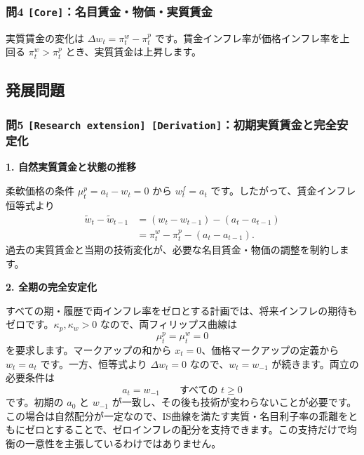 \documentclass[
  japanese,
  lualatex,
  ja=standard,
  11pt,
  a4paper]{ltjsarticle}
\begin{document}
\subsubsection{\texorpdfstring{問4
\texttt{{[}Core{]}}：名目賃金・物価・実質賃金}{問4 {[}Core{]}：名目賃金・物価・実質賃金}}\label{ux554f4-coreux540dux76eeux8cc3ux91d1ux7269ux4fa1ux5b9fux8ceaux8cc3ux91d1}

実質賃金の変化は \(\Delta w_t=\pi_t^w-\pi_t^p\)
です。賃金インフレ率が価格インフレ率を上回る \(\pi_t^w>\pi_t^p\)
とき、実質賃金は上昇します。

\subsection{発展問題}\label{ux767aux5c55ux554fux984c-9}

\subsubsection{\texorpdfstring{問5
\texttt{{[}Research\ extension{]}\ {[}Derivation{]}}：初期実質賃金と完全安定化}{問5 {[}Research extension{]} {[}Derivation{]}：初期実質賃金と完全安定化}}\label{ux554f5-research-extension-derivationux521dux671fux5b9fux8ceaux8cc3ux91d1ux3068ux5b8cux5168ux5b89ux5b9aux5316}

\textbf{1. 自然実質賃金と状態の推移}

柔軟価格の条件 \(\mu_t^p=a_t-w_t=0\) から \(w_t^f=a_t\)
です。したがって、賃金インフレ恒等式より \[
\begin{aligned}
\widetilde w_t-\widetilde w_{t-1}
&=(w_t-w_{t-1})-(a_t-a_{t-1})\\
&=\pi_t^w-\pi_t^p-(a_t-a_{t-1}).
\end{aligned}
\]
過去の実質賃金と当期の技術変化が、必要な名目賃金・物価の調整を制約します。

\textbf{2. 全期の完全安定化}

すべての期・履歴で両インフレ率をゼロとする計画では、将来インフレの期待もゼロです。\(\kappa_p,\kappa_w>0\)
なので、両フィリップス曲線は \[
\mu_t^p=\mu_t^w=0
\] を要求します。マークアップの和から
\(x_t=0\)、価格マークアップの定義から \(w_t=a_t\) です。一方、恒等式より
\(\Delta w_t=0\) なので、\(w_t=w_{-1}\) が続きます。両立の必要条件は \[
a_t=w_{-1}\qquad\text{すべての }t\geq0
\] です。初期の \(a_0\) と \(w_{-1}\)
が一致し、その後も技術が変わらないことが必要です。この場合は自然配分が一定なので、IS曲線を満たす実質・名目利子率の乖離をともにゼロとすることで、ゼロインフレの配分を支持できます。この支持だけで均衡の一意性を主張しているわけではありません。
\end{document}
